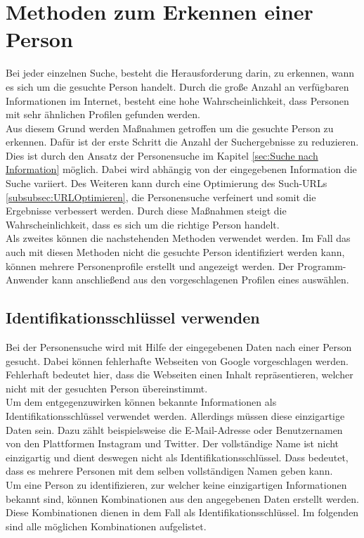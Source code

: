 \section{Methoden zum Erkennen einer Person}
\label{sec:WannhandeltessichumdiegesuchtePerson}
Bei jeder einzelnen Suche, besteht die Herausforderung darin, zu erkennen, wann es sich um die gesuchte Person handelt. Durch die große Anzahl an verfügbaren Informationen im Internet, besteht eine hohe Wahrscheinlichkeit, dass Personen mit sehr ähnlichen Profilen gefunden werden.\\
Aus diesem Grund werden Maßnahmen getroffen um die gesuchte Person zu erkennen. Dafür ist der erste Schritt die Anzahl der Suchergebnisse zu reduzieren. Dies ist durch den Ansatz der Personensuche im Kapitel \ref{sec:Suche nach Information} möglich. Dabei wird abhängig von der eingegebenen Information die Suche variiert. Des Weiteren kann durch eine Optimierung des Such-URLs \ref{subsubsec:URLOptimieren}, die Personensuche verfeinert und somit die Ergebnisse verbessert werden. Durch diese Maßnahmen steigt die Wahrscheinlichkeit, dass es sich um die richtige Person handelt.\\
Als zweites können die nachstehenden Methoden verwendet werden. Im Fall das auch mit diesen Methoden nicht die gesuchte Person identifiziert werden kann, können mehrere Personenprofile erstellt und angezeigt werden. Der Programm-Anwender kann anschließend aus den vorgeschlagenen Profilen eines auswählen.

	\subsection{Identifikationsschlüssel verwenden}
	\label{subsec:VorlaeufigInhaltskontrolle}
	Bei der Personensuche wird mit Hilfe der eingegebenen Daten nach einer Person gesucht. Dabei können fehlerhafte Webseiten von Google vorgeschlagen werden. Fehlerhaft bedeutet hier, dass die Webseiten einen Inhalt repräsentieren, welcher nicht mit der gesuchten Person übereinstimmt.\\ 
	Um dem entgegenzuwirken können bekannte Informationen als Identifikationsschlüssel verwendet werden. Allerdings müssen diese einzigartige Daten sein. Dazu zählt beispielsweise die E-Mail-Adresse oder Benutzernamen von den Plattformen Instagram und Twitter. Der vollständige Name ist nicht einzigartig und dient deswegen nicht als Identifikationsschlüssel. Dass bedeutet, dass es mehrere Personen mit dem selben vollständigen Namen geben kann.\\
	Um eine Person zu identifizieren, zur welcher keine einzigartigen Informationen bekannt sind, können Kombinationen aus den angegebenen Daten erstellt werden. Diese Kombinationen dienen in dem Fall als Identifikationsschlüssel. Im folgenden sind alle möglichen Kombinationen aufgelistet.
	
